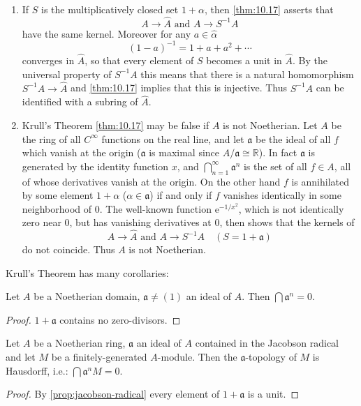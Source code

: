 \begin{remark}
    \begin{enumerate}[1)]
        \item If $S$ is the multiplicatively closed set $1 + \alpha$, then \eqref{thm:10.17} asserts that  
        \[
        A \to \widehat{A} \text{ and } A \to S^{-1} A
        \]  
        have the same kernel. Moreover for any $a \in \widehat{\alpha}$  
        \[
        (1 - a)^{-1} = 1 + a + a^2 + \cdots
        \]  
        converges in $\widehat{A}$, so that every element of $S$ becomes a unit in $\widehat{A}$. By the universal property of $S^{-1} A$ this means that there is a natural homomorphism $S^{-1} A \to \widehat{A}$ and \eqref{thm:10.17} implies that this is injective. Thus $S^{-1} A$ can be identified with a subring of $\widehat{A}$.
        \item Krull's Theorem \eqref{thm:10.17} may be false if $A$ is not Noetherian. Let $A$ be the ring of all $C^\infty$ functions on the real line, and let $\mathfrak{a}$ be the ideal of all $f$ which vanish at the origin ($\mathfrak{a}$ is maximal since $A/\mathfrak{a} \cong \mathbb{R}$). In fact $\mathfrak{a}$ is generated by the identity function $x$, and $\bigcap_{n=1}^\infty \mathfrak{a}^n$ is the set of all $f \in A$, all of whose derivatives vanish at the origin. On the other hand $f$ is annihilated by some element $1 + \alpha$ ($\alpha \in \mathfrak{a}$) if and only if $f$ vanishes identically in some neighborhood of $0$. The well-known function $\mathrm{e}^{-1/x^2}$, which is not identically zero near $0$, but has vanishing derivatives at $0$, then shows that the kernels of  
        \[
        A \to \widehat{A} \text{ and } A \to S^{-1}A \quad (S = 1 + \mathfrak{a})
        \]  
        do not coincide. Thus $A$ is not Noetherian.
    \end{enumerate}
\end{remark}

Krull's Theorem has many corollaries:

\begin{corollary}\label{cor:10.18}
Let $A$ be a Noetherian domain, $\mathfrak{a} \neq (1)$ an ideal of $A$. Then $\bigcap \mathfrak{a}^n = 0$.
\end{corollary}

\begin{proof}
$1 + \mathfrak{a}$ contains no zero-divisors. 
\end{proof}

\begin{corollary}\label{cor:10.19}
    Let $A$ be a Noetherian ring, $\mathfrak{a}$ an ideal of $A$ contained in the Jacobson radical and let $M$ be a finitely-generated $A$-module. Then the $\mathfrak{a}$-topology of $M$ is Hausdorff, i.e.: $\bigcap \mathfrak{a}^n M = 0$. 
\end{corollary}
\begin{proof}
    By \eqref{prop:jacobson-radical} every element of $1 + \mathfrak{a}$ is a unit. 
\end{proof}

